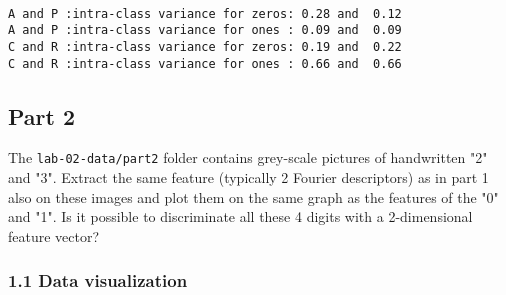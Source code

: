 \documentclass[11pt]{article}
\begin{document}
    \begin{center}
    \end{center}
    { \hspace*{\fill} \\}
    
    \begin{Verbatim}[commandchars=\\\{\}]
A and P :intra-class variance for zeros: 0.28 and  0.12
A and P :intra-class variance for ones : 0.09 and  0.09
C and R :intra-class variance for zeros: 0.19 and  0.22
C and R :intra-class variance for ones : 0.66 and  0.66

    \end{Verbatim}

    \subsection{Part 2}\label{part-2}

The \texttt{lab-02-data/part2} folder contains grey-scale pictures of
handwritten "2" and "3". Extract the same feature (typically 2 Fourier
descriptors) as in part 1 also on these images and plot them on the same
graph as the features of the "0" and "1". Is it possible to discriminate
all these 4 digits with a 2-dimensional feature vector?

    \subsubsection{1.1 Data visualization}\label{data-visualization}
\end{document}
